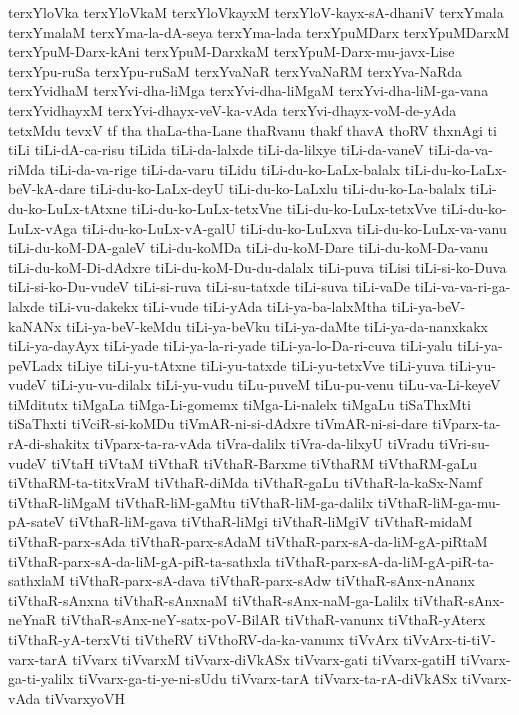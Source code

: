 {terxYloVka
terxYloVkaM
terxYloVkayxM
terxYloV-kayx-sA-dhaniV
terxYmala
terxYmalaM
terxYma-la-dA-seya
terxYma-lada
terxYpuMDarx
terxYpuMDarxM
terxYpuM-Darx-kAni
terxYpuM-DarxkaM
terxYpuM-Darx-mu-javx-Lise
terxYpu-ruSa
terxYpu-ruSaM
terxYvaNaR
terxYvaNaRM
terxYva-NaRda
terxYvidhaM
terxYvi-dha-liMga
terxYvi-dha-liMgaM
terxYvi-dha-liM-ga-vana
terxYvidhayxM
terxYvi-dhayx-veV-ka-vAda
terxYvi-dhayx-voM-de-yAda
tetxMdu
tevxV
tf
tha
thaLa-tha-Lane
thaRvanu
thakf
thavA
thoRV
thxnAgi
ti
tiLi
tiLi-dA-ca-risu
tiLida
tiLi-da-lalxde
tiLi-da-lilxye
tiLi-da-vaneV
tiLi-da-va-riMda
tiLi-da-va-rige
tiLi-da-varu
tiLidu
tiLi-du-ko-LaLx-balalx
tiLi-du-ko-LaLx-beV-kA-dare
tiLi-du-ko-LaLx-deyU
tiLi-du-ko-LaLxlu
tiLi-du-ko-La-balalx
tiLi-du-ko-LuLx-tAtxne
tiLi-du-ko-LuLx-tetxVne
tiLi-du-ko-LuLx-tetxVve
tiLi-du-ko-LuLx-vAga
tiLi-du-ko-LuLx-vA-galU
tiLi-du-ko-LuLxva
tiLi-du-ko-LuLx-va-vanu
tiLi-du-koM-DA-galeV
tiLi-du-koMDa
tiLi-du-koM-Dare
tiLi-du-koM-Da-vanu
tiLi-du-koM-Di-dAdxre
tiLi-du-koM-Du-du-dalalx
tiLi-puva
tiLisi
tiLi-si-ko-Duva
tiLi-si-ko-Du-vudeV
tiLi-si-ruva
tiLi-su-tatxde
tiLi-suva
tiLi-vaDe
tiLi-va-va-ri-ga-lalxde
tiLi-vu-dakekx
tiLi-vude
tiLi-yAda
tiLi-ya-ba-lalxMtha
tiLi-ya-beV-kaNANx
tiLi-ya-beV-keMdu
tiLi-ya-beVku
tiLi-ya-daMte
tiLi-ya-da-nanxkakx
tiLi-ya-dayAyx
tiLi-yade
tiLi-ya-la-ri-yade
tiLi-ya-lo-Da-ri-cuva
tiLi-yalu
tiLi-ya-peVLadx
tiLiye
tiLi-yu-tAtxne
tiLi-yu-tatxde
tiLi-yu-tetxVve
tiLi-yuva
tiLi-yu-vudeV
tiLi-yu-vu-dilalx
tiLi-yu-vudu
tiLu-puveM
tiLu-pu-venu
tiLu-va-Li-keyeV
tiMditutx
tiMgaLa
tiMga-Li-gomemx
tiMga-Li-nalelx
tiMgaLu
tiSaThxMti
tiSaThxti
tiVciR-si-koMDu
tiVmAR-ni-si-dAdxre
tiVmAR-ni-si-dare
tiVparx-ta-rA-di-shakitx
tiVparx-ta-ra-vAda
tiVra-dalilx
tiVra-da-lilxyU
tiVradu
tiVri-su-vudeV
tiVtaH
tiVtaM
tiVthaR
tiVthaR-Barxme
tiVthaRM
tiVthaRM-gaLu
tiVthaRM-ta-titxVraM
tiVthaR-diMda
tiVthaR-gaLu
tiVthaR-la-kaSx-Namf
tiVthaR-liMgaM
tiVthaR-liM-gaMtu
tiVthaR-liM-ga-dalilx
tiVthaR-liM-ga-mu-pA-sateV
tiVthaR-liM-gava
tiVthaR-liMgi
tiVthaR-liMgiV
tiVthaR-midaM
tiVthaR-parx-sAda
tiVthaR-parx-sAdaM
tiVthaR-parx-sA-da-liM-gA-piRtaM
tiVthaR-parx-sA-da-liM-gA-piR-ta-sathxla
tiVthaR-parx-sA-da-liM-gA-piR-ta-sathxlaM
tiVthaR-parx-sA-dava
tiVthaR-parx-sAdw
tiVthaR-sAnx-nAnanx
tiVthaR-sAnxna
tiVthaR-sAnxnaM
tiVthaR-sAnx-naM-ga-Lalilx
tiVthaR-sAnx-neYnaR
tiVthaR-sAnx-neY-satx-poV-BilAR
tiVthaR-vanunx
tiVthaR-yAterx
tiVthaR-yA-terxVti
tiVtheRV
tiVthoRV-da-ka-vanunx
tiVvArx
tiVvArx-ti-tiV-varx-tarA
tiVvarx
tiVvarxM
tiVvarx-diVkASx
tiVvarx-gati
tiVvarx-gatiH
tiVvarx-ga-ti-yalilx
tiVvarx-ga-ti-ye-ni-sUdu
tiVvarx-tarA
tiVvarx-ta-rA-diVkASx
tiVvarx-vAda
tiVvarxyoVH
}
